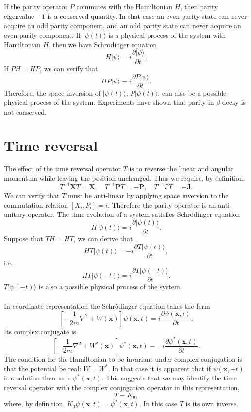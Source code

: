 \noindent
If the parity operator $P$ commutes with the Hamiltonian $H$, then parity eigenvalue $\pm 1$ is a conserved quantity. In that case an even parity state can never acquire an odd parity component, and an odd parity state can never acquire an even parity component.
If $|\psi(t)\rangle$ is a physical process of the system with Hamiltonian $H$, then we have Schrödinger equation 
\[H|\psi\rangle = i\frac{\partial |\psi\rangle }{\partial t}.\]
If $PH = HP$, we can verify that
\[H P|\psi\rangle = i\frac{\partial P |\psi\rangle }{\partial t}.\]
Therefore, the space inversion of $|\psi(t)\rangle$, $P|\psi(t)\rangle$, can also be a possible physical process of the system.
Experiments have shown that parity in $\beta$ decay is not conserved.

\section{Time reversal}
The effect of the time reversal operator $T$ is to reverse the linear and angular momentum while leaving the position unchanged. Thus we require, by definition,
\[T^{-1}\bm{X}T = \bm{X} , \quad T^{-1}\bm{P}T = -\bm{P} , \quad T^{-1}\bm{J}T = -\bm{J}.\]
We can verify that $T$ must be anti-linear by applying space inversion to the commutation relation $[X_i,P_i] = i$. Therefore the parity operator is an anti-unitary operator.
The time evolution of a system satisfies Schrödinger equation
\[H|\psi(t)\rangle = i\frac{\partial |\psi(t)\rangle }{\partial t}.\]
Suppose that $TH=HT$, we can derive that
\[HT|\psi(t)\rangle = -i\frac{\partial T|\psi(t)\rangle }{\partial t},\]
i.e.
\[HT|\psi(-t)\rangle = i\frac{\partial T|\psi(-t)\rangle }{\partial t}.\]
$T|\psi(-t)\rangle$ is also a possible physical process of the system.
\\ \\
In coordinate representation the Schrödinger equation takes the form
\[ \left[ -\frac{1}{2m}\nabla^2 + W(\bm{x}) \right] \psi(\bm{x},t) = i\frac{\partial \psi(\bm{x},t)}{\partial t}.\]
Its complex conjugate is
\[ \left[ -\frac{1}{2m}\nabla^2 + W^*(\bm{x}) \right] \psi^*(\bm{x},t) = -i\frac{\partial \psi^*(\bm{x},t)}{\partial t}.\]
The condition for the Hamiltonian to be invariant under complex conjugation is that the potential be real: $W=W^*$. In that case it is apparent that if $\psi(\bm{x},-t)$ is a solution then so is  $\psi^*(\bm{x},t)$. This suggests that we may identify the time reversal operator with the complex conjugation operator in this representation,
\[T = K_0,\]
where, by definition, $K_0\psi(\bm{x},t) = \psi^*(\bm{x},t)$. In this case $T$ is its own inverse. 
